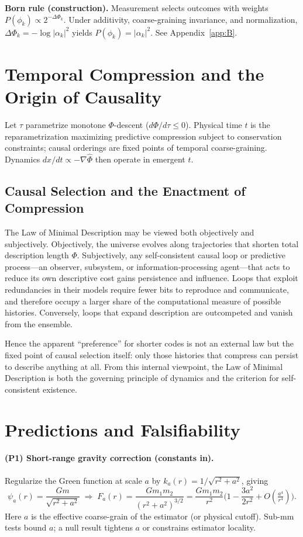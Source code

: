 \documentclass[aps,preprint,onecolumn,longbibliography,nofootinbib]{revtex4-2}
\numberwithin{equation}{section}        %
\begin{document}
\textbf{Born rule (construction).} Measurement selects outcomes with weights $P(\phi_k)\propto 2^{-\Delta\Phi_k}$. Under additivity, coarse-graining invariance, and normalization, $\Delta\Phi_k=-\log|\alpha_k|^2$ yields $P(\phi_k)=|\alpha_k|^2$. See Appendix~\ref{app:B}.

\section{Temporal Compression and the Origin of Causality}
Let $\tau$ parametrize monotone $\Phi$-descent ($d\Phi/d\tau\le 0$). Physical time $t$ is the reparametrization maximizing predictive compression subject to conservation constraints; causal orderings are fixed points of temporal coarse-graining. Dynamics $dx/dt\propto-\nabla\widehat\Phi$ then operate in emergent $t$.
\subsection*{Causal Selection and the Enactment of Compression}

The Law of Minimal Description may be viewed both objectively and subjectively. 
Objectively, the universe evolves along trajectories that shorten total description length $\Phi$. 
Subjectively, any self-consistent causal loop or predictive process---an observer, subsystem, or information‐processing agent---that acts to reduce its own descriptive cost gains persistence and influence. 
Loops that exploit redundancies in their models require fewer bits to reproduce and communicate, and therefore occupy a larger share of the computational measure of possible histories. 
Conversely, loops that expand description are outcompeted and vanish from the ensemble. 

Hence the apparent ``preference'' for shorter codes is not an external law but the fixed point of causal selection itself: 
only those histories that compress can persist to describe anything at all. 
From this internal viewpoint, the Law of Minimal Description is both the governing principle of dynamics and the criterion for self-consistent existence.

\section{Predictions and Falsifiability}
\paragraph*{(P1) Short-range gravity correction (constants in).}
Regularize the Green function at scale $a$ by $k_a(r)=1/\sqrt{r^2+a^2}$, giving
\begin{equation}
\psi_a(r)=\frac{G m}{\sqrt{r^2+a^2}}
\;\Rightarrow\;
F_a(r)=\frac{G m_1 m_2}{(r^2+a^2)^{3/2}}
=\frac{G m_1 m_2}{r^2}\Big(1-\frac{3a^2}{2r^2}+O(\tfrac{a^4}{r^4})\Big). \label{eq:short}
\end{equation}
Here $a$ is the effective coarse-grain of the estimator (or physical cutoff). Sub-mm tests bound $a$; a null result tightens $a$ or constrains estimator locality.
\end{document}
